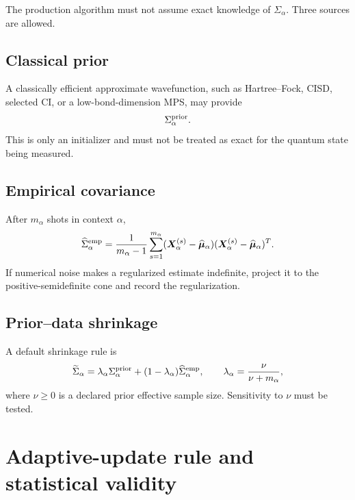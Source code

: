 \documentclass[11pt]{article}
\begin{document}
The production algorithm must not assume exact knowledge of $\Sigma_\alpha$.  Three sources are allowed.

\subsection{Classical prior}
A classically efficient approximate wavefunction, such as Hartree--Fock, CISD, selected CI, or a low-bond-dimension MPS, may provide
\begin{equation}
  \Sigma_\alpha^{\rm prior}.
\end{equation}
This is only an initializer and must not be treated as exact for the quantum state being measured.

\subsection{Empirical covariance}
After $m_\alpha$ shots in context $\alpha$,
\begin{equation}
  \widehat\Sigma_\alpha^{\rm emp}
  =\frac{1}{m_\alpha-1}
  \sum_{s=1}^{m_\alpha}
  (\bm X_\alpha^{(s)}-\widehat{\bm\mu}_\alpha)
  (\bm X_\alpha^{(s)}-\widehat{\bm\mu}_\alpha)^T.
  \label{eq:empirical-cov}
\end{equation}
If numerical noise makes a regularized estimate indefinite, project it to the positive-semidefinite cone and record the regularization.

\subsection{Prior--data shrinkage}
A default shrinkage rule is
\begin{equation}
  \widetilde\Sigma_\alpha
  =\lambda_\alpha\Sigma_\alpha^{\rm prior}
  +(1-\lambda_\alpha)\widehat\Sigma_\alpha^{\rm emp},
  \qquad
  \lambda_\alpha=\frac{\nu}{\nu+m_\alpha},
  \label{eq:shrinkage}
\end{equation}
where $\nu\ge0$ is a declared prior effective sample size.  Sensitivity to $\nu$ must be tested.

\section{Adaptive-update rule and statistical validity}
\end{document}
